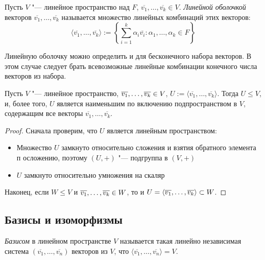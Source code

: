 \begin{definition}
	Пусть $V$ "--- линейное пространство над $F$, $\overline{v_1}, \dots, \overline{v_k} \in V$. \textit{Линейной оболочкой} векторов $\overline{v_1}, \dots, \overline{v_k}$ называется множество линейных комбинаций этих векторов:
	\[\langle\overline{v_1}, \dots, \overline{v_k}\rangle := \left\{\sum_{i = 1}^{k}\alpha_i\overline{v_i}: \alpha_1, \dots, \alpha_k \in F\right\}\]
\end{definition}

\begin{note}
	Линейную оболочку можно определить и для бесконечного набора векторов. В этом случае следует брать всевозможные линейные комбинации конечного числа векторов из набора.
\end{note}

\begin{proposition}
	Пусть $V$ "--- линейное пространство, $\overline{v_1}, \dots, \overline{v_k} \hm{\in} V$, $U := \langle\overline{v_1}, \dots, \overline{v_k}\rangle$. Тогда $U \le V$, и, более того, $U$ является наименьшим по включению подпространством в $V$, содержащим все векторы $\overline{v_1}, \dotsc, \overline{v_k}$.
\end{proposition}

\begin{proof}
	Сначала проверим, что $U$ является линейным пространством:
	\begin{itemize}
		\item Множество $U$ замкнуто относительно сложения и взятия обратного элемента п осложению, поэтому $(U, +)$ "--- подгруппа в $(V, +)$
		
		\item $U$ замкнуто относительно умножения на скаляр
	\end{itemize}

	Наконец, если $W \le V$ и $\overline{v_1}, \dots, \overline{v_k} \hm{\in} W$, то и $U = \langle\overline{v_1}, \dots, \overline{v_k}\rangle \hm{\subset} W$.
\end{proof}

\subsection{Базисы и изоморфизмы}

\begin{definition}
	\textit{Базисом} в линейном пространстве $V$ называется такая линейно независимая система $(\overline{v_1}, \dots, \overline{v_n})$ векторов из $V$, что $\langle\overline{v_1}, \dots, \overline{v_n}\rangle = V$.
\end{definition}

